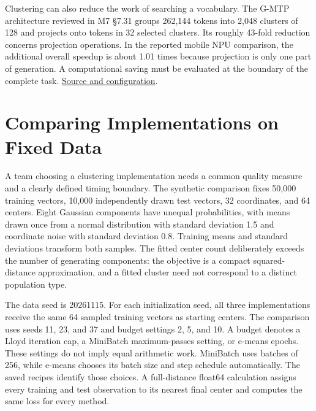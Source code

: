 \noindent Clustering can also reduce the work of searching a vocabulary.
The G-MTP architecture reviewed in M7 §7.31 groups 262,144 tokens into
2,048 clusters of 128 and projects onto tokens in 32 selected clusters.
Its roughly 43-fold reduction concerns projection operations. In the
reported mobile NPU comparison, the additional overall speedup is about
1.01 times because projection is only one part of generation. A
computational saving must be evaluated at the boundary of the complete
task. \href{../01_Resources/27_AI_Inference_Efficiency/README.md}{Source
and configuration}.

\hypertarget{M04-comparing-implementations-on-fixed-data}{%
\section{Comparing Implementations on Fixed
Data}\label{M04-comparing-implementations-on-fixed-data}}

\noindent \noindent A team choosing a clustering implementation needs a common
quality measure and a clearly defined timing boundary. The synthetic
comparison fixes 50,000 training vectors, 10,000 independently drawn
test vectors, 32 coordinates, and 64 centers. Eight Gaussian components
have unequal probabilities, with means drawn once from a normal
distribution with standard deviation 1.5 and coordinate noise with
standard deviation 0.8. Training means and standard deviations transform
both samples. The fitted center count deliberately exceeds the number of
generating components: the objective is a compact squared-distance
approximation, and a fitted cluster need not correspond to a distinct
population type.

The data seed is 20261115. For each initialization seed, all three
implementations receive the same 64 sampled training vectors as starting
centers. The comparison uses seeds 11, 23, and 37 and budget settings 2,
5, and 10. A budget denotes a Lloyd iteration cap, a MiniBatch
maximum-passes setting, or e-means epochs. These settings do not imply
equal arithmetic work. MiniBatch uses batches of 256, while e-means
chooses its batch size and step schedule automatically. The saved
recipes identify those choices. A full-distance float64 calculation
assigns every training and test observation to its nearest final center
and computes the same loss for every method.

